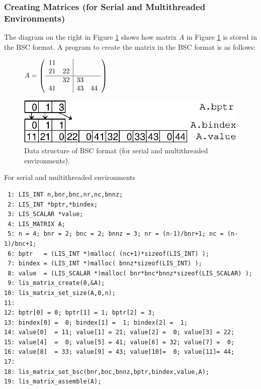 \documentclass[a4paper]{article}
\begin{document}
\subsubsection{Creating Matrices (for Serial and Multithreaded Environments)}
The diagram on the right in Figure \ref{fig:storage08} shows how matrix $A$ in Figure \ref{fig:storage08} is stored in the BSC format. A program to create the matrix in the BSC format is as follows:
\begin{figure}[h]
{\centering 
\begin{minipage}{0.3\textwidth}
\begin{flushright}
$ 
A = \left(
\begin{array}{cc|cc}
11 &    &    &    \\
21 & 22 &    &    \\ \hline
   & 32 & 33 &    \\
41 &    & 43 & 44 \\
\end{array}\right)
$
\end{flushright}
\end{minipage}
\begin{minipage}{0.6\textwidth}
\begin{flushleft}
\includegraphics{storage08.eps} 
\end{flushleft}
\end{minipage}
\caption{Data structure of BSC format (for serial and multithreaded environments).}\label{fig:storage08}}
\end{figure}
\begin{itemsquarebox}[l]{For serial and multithreaded environments}
\small
\begin{verbatim}
 1: LIS_INT n,bnr,bnc,nr,nc,bnnz;
 2: LIS_INT *bptr,*bindex;
 3: LIS_SCALAR *value;
 4: LIS_MATRIX A;
 5: n = 4; bnr = 2; bnc = 2; bnnz = 3; nr = (n-1)/bnr+1; nc = (n-1)/bnc+1;
 6: bptr   = (LIS_INT *)malloc( (nc+1)*sizeof(LIS_INT) );
 7: bindex = (LIS_INT *)malloc( bnnz*sizeof(LIS_INT) );
 8: value  = (LIS_SCALAR *)malloc( bnr*bnc*bnnz*sizeof(LIS_SCALAR) );
 9: lis_matrix_create(0,&A);
10: lis_matrix_set_size(A,0,n);
11:
12: bptr[0] = 0; bptr[1] = 1; bptr[2] = 3;
13: bindex[0] =  0; bindex[1] =  1; bindex[2] =  1;
14: value[0]  = 11; value[1] = 21; value[2] =  0; value[3] = 22;
15: value[4]  =  0; value[5] = 41; value[6] = 32; value[7] =  0;
16: value[8]  = 33; value[9] = 43; value[10]=  0; value[11]= 44;
17:
18: lis_matrix_set_bsc(bnr,bnc,bnnz,bptr,bindex,value,A);
19: lis_matrix_assemble(A);
\end{verbatim}
\end{itemsquarebox}
\end{document}
